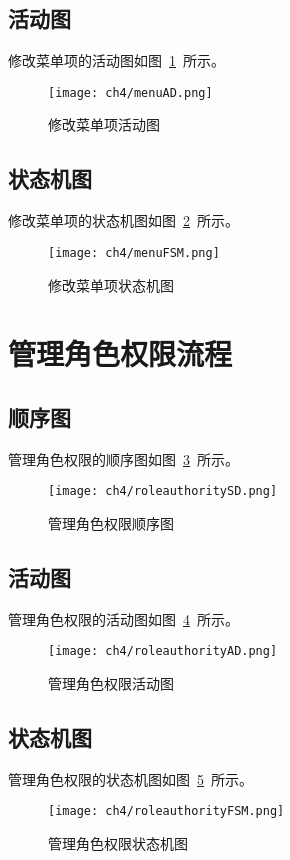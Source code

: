 \subsection{活动图}
修改菜单项的活动图如图~\ref{fig:menuAD}~所示。
\begin{figure}[htbp]
    \centering
    \texttt{[image: ch4/menuAD.png]}
    \caption{修改菜单项活动图}\label{fig:menuAD}
    \vspace{\baselineskip} %
\end{figure}
\subsection{状态机图}
修改菜单项的状态机图如图~\ref{fig:menuFSM}~所示。
\begin{figure}[htbp]
    \centering
    \texttt{[image: ch4/menuFSM.png]}
    \caption{修改菜单项状态机图}\label{fig:menuFSM}
    \vspace{\baselineskip} %
\end{figure}

\section{管理角色权限流程}

\subsection{顺序图}
管理角色权限的顺序图如图~\ref{fig:roleauthoritySD}~所示。
\begin{figure}[htbp]
    \centering
    \texttt{[image: ch4/roleauthoritySD.png]}
    \caption{管理角色权限顺序图}\label{fig:roleauthoritySD}
    \vspace{\baselineskip} %
\end{figure}
\subsection{活动图}
管理角色权限的活动图如图~\ref{fig:roleauthorityAD}~所示。
\begin{figure}[htbp]
    \centering
    \texttt{[image: ch4/roleauthorityAD.png]}
    \caption{管理角色权限活动图}\label{fig:roleauthorityAD}
    \vspace{\baselineskip} %
\end{figure}
\subsection{状态机图}
管理角色权限的状态机图如图~\ref{fig:roleauthorityFSM}~所示。
\begin{figure}[htbp]
    \centering
    \texttt{[image: ch4/roleauthorityFSM.png]}
    \caption{管理角色权限状态机图}\label{fig:roleauthorityFSM}
    \vspace{\baselineskip} %
\end{figure}

